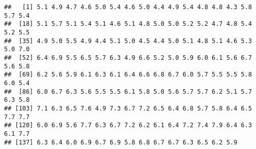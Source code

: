 \documentclass[]{article}
\newenvironment{Shaded}{\begin{snugshade}}{\end{snugshade}}
\newcommand{\StringTok}[1]{\textcolor[rgb]{0.31,0.60,0.02}{#1}}
\newcommand{\OtherTok}[1]{\textcolor[rgb]{0.56,0.35,0.01}{#1}}
\newcommand{\OperatorTok}[1]{\textcolor[rgb]{0.81,0.36,0.00}{\textbf{#1}}}
\newcommand{\NormalTok}[1]{#1}
\begin{document}
\begin{verbatim}
##   [1] 5.1 4.9 4.7 4.6 5.0 5.4 4.6 5.0 4.4 4.9 5.4 4.8 4.8 4.3 5.8 5.7 5.4
##  [18] 5.1 5.7 5.1 5.4 5.1 4.6 5.1 4.8 5.0 5.0 5.2 5.2 4.7 4.8 5.4 5.2 5.5
##  [35] 4.9 5.0 5.5 4.9 4.4 5.1 5.0 4.5 4.4 5.0 5.1 4.8 5.1 4.6 5.3 5.0 7.0
##  [52] 6.4 6.9 5.5 6.5 5.7 6.3 4.9 6.6 5.2 5.0 5.9 6.0 6.1 5.6 6.7 5.6 5.8
##  [69] 6.2 5.6 5.9 6.1 6.3 6.1 6.4 6.6 6.8 6.7 6.0 5.7 5.5 5.5 5.8 6.0 5.4
##  [86] 6.0 6.7 6.3 5.6 5.5 5.5 6.1 5.8 5.0 5.6 5.7 5.7 6.2 5.1 5.7 6.3 5.8
## [103] 7.1 6.3 6.5 7.6 4.9 7.3 6.7 7.2 6.5 6.4 6.8 5.7 5.8 6.4 6.5 7.7 7.7
## [120] 6.0 6.9 5.6 7.7 6.3 6.7 7.2 6.2 6.1 6.4 7.2 7.4 7.9 6.4 6.3 6.1 7.7
## [137] 6.3 6.4 6.0 6.9 6.7 6.9 5.8 6.8 6.7 6.7 6.3 6.5 6.2 5.9
\end{verbatim}

\begin{Shaded}
\end{Shaded}
\end{document}

